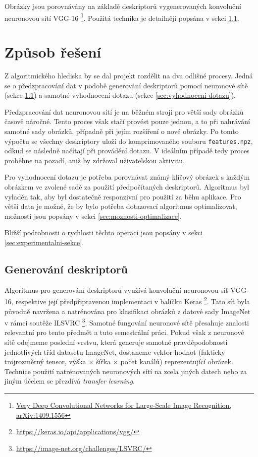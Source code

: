 \documentclass[12pt]{article}
\begin{document}
Obrázky jsou porovnávány na základě deskriptorů vygenerovaných konvoluční neuronovou sítí VGG-16%
\footnote{\href{https://arxiv.org/abs/1409.1556}{Very Deep Convolutional Networks for Large-Scale Image Recognition, arXiv:1409.1556}}.
Použitá technika je detailněji popsána v sekci \ref{sec:generovani-deskriptoru}.

\section{Způsob řešení}

Z algoritmického hlediska by se dal projekt rozdělit na dva odlišné procesy.
Jedná se o předzpracování dat v podobě generování deskriptorů pomocí neuronové sítě (sekce \ref{sec:generovani-deskriptoru}) a samotné vyhodnocení dotazu (sekce \ref{sec:vyhodnoceni-dotazu}).

Předzpracování dat neuronovou sítí je na běžném stroji pro větší sady obrázků časově náročné.
Tento proces však stačí provést pouze jednou, a to při nahrávání samotné sady obrázků, případně při jejím rozšíření o nové obrázky.
Po tomto výpočtu se všechny deskriptory uloží do komprimovaného souboru \texttt{features.npz}, odkud se následně načítají při provádění dotazu.
V ideálním případě tedy proces proběhne na pozadí, aniž by zdržoval uživatelskou aktivitu.

Pro vyhodnocení dotazu je potřeba porovnávat známý klíčový obrázek s každým obrázkem ve zvolené sadě za použití předpočítaných deskriptorů.
Algoritmus byl vyladěn tak, aby byl dostatečně responzivní pro použití za běhu aplikace.
Pro větší data je možné, že by bylo potřeba dotazovací algoritmus optimalizovat, možnosti jsou popsány v sekci \ref{sec:moznosti-optimalizace}.

Bližší podrobnosti o rychlosti těchto operací jsou popsány v sekci \ref{sec:experimentalni-sekce}.

\subsection{Generování deskriptorů}\label{sec:generovani-deskriptoru}

Algoritmus pro generování deskriptorů využívá konvoluční neuronovou síť VGG-16, respektive její předpřipravenou implementaci v balíčku Keras%
\footnote{\url{https://keras.io/api/applications/vgg/}}.
Tato síť byla původně navržena a natrénována pro klasifikaci obrázků z datové sady ImageNet v rámci soutěže ILSVRC%
\footnote{\url{https://image-net.org/challenges/LSVRC/}}.
Samotné fungování neuronové sítě přesahuje znalosti relevantní pro tento předmět a tuto semestrální práci.
Pokud však z neuronové sítě odejmeme poslední vrstvu, která generuje samotné pravděpodobnosti jednotlivých tříd datasetu ImageNet, dostaneme vektor hodnot (fakticky trojrozměrný tensor, výška $\times$ šířka $\times$ počet kanálů) reprezentující obrázek.
Technice použití natrénovaných neuronových sítí na zcela jiných datech nebo za jiným účelem se přezdívá \emph{transfer learning}.
\end{document}
